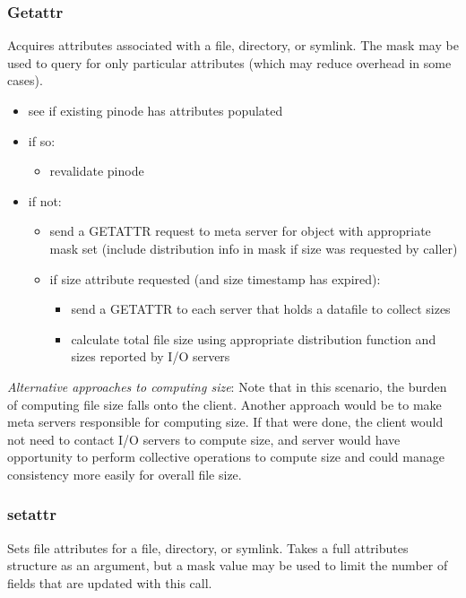 \documentclass[11pt, letterpaper]{article}
\begin{document}
\subsubsection{Getattr}

Acquires attributes associated with a file, directory, or symlink.  The
mask may be used to query for only particular attributes (which may
reduce overhead in some cases).

\begin{itemize}
	\item see if existing pinode has attributes populated
	\item if so:
	\begin{itemize}
		\item revalidate pinode
	\end{itemize}
	\item if not:
	\begin{itemize}
		\item send a GETATTR request to meta server for object with appropriate
		mask set (include distribution info in mask if size was requested
		by caller)
		\item if size attribute requested (and size timestamp has
		expired):
		\begin{itemize}
			\item send a GETATTR to each server that holds a datafile to collect
			sizes
			\item calculate total file size using appropriate distribution function
			and sizes reported by I/O servers
		\end{itemize}
	\end{itemize}
\end{itemize}

\emph{Alternative approaches to computing size}:
Note that in this scenario, the burden of computing file size falls onto
the client.  Another approach would be to make meta servers responsible
for computing size.  If that were done, the client would not need to
contact I/O servers to compute size, and server would have opportunity
to perform collective operations to compute size and could manage
consistency more easily for overall file size.

\subsubsection{setattr}

Sets file attributes for a file, directory, or symlink.  Takes a full
attributes structure as an argument, but a mask value may be used to
limit the number of fields that are updated with this call.
\end{document}
